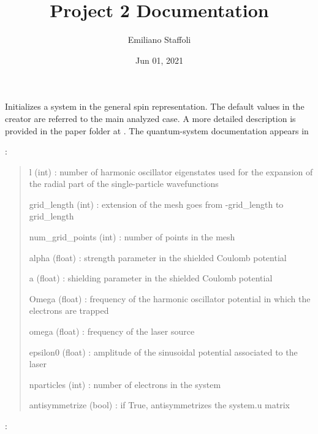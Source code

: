 \documentclass[letterpaper,10pt,english]{sphinxmanual}
\title{Project 2 Documentation}
\date{Jun 01, 2021}
\author{Emiliano Staffoli}
\begin{document}
\pagestyle{empty}
\sphinxmaketitle
\pagestyle{plain}
\sphinxtableofcontents
\pagestyle{normal}
\label{\detokenize{index::doc}}


\begin{fulllineitems}
\label{\detokenize{index:do.GHF}}
Initializes a system in the general spin representation. The default values in the creator are referred to the main analyzed case.
A more detailed description is provided in the paper folder at .
The quantum-system documentation appears in 

:
\begin{quote}

l (int) : number of harmonic oscillator eigenstates used for the expansion of the radial part of the single-particle wavefunctions

grid\_length (int) : extension of the mesh goes from -grid\_length to grid\_length

num\_grid\_points (int) : number of points in the mesh

alpha (float) : strength parameter in the shielded Coulomb potential

a (float) : shielding parameter in the shielded Coulomb potential

Omega (float) : frequency of the harmonic oscillator potential in which the electrons are trapped

omega (float) : frequency of the laser source

epsilon0 (float) : amplitude of the sinusoidal potential associated to the laser

nparticles (int) : number of electrons in the system

antisymmetrize (bool) : if True, antisymmetrizes the system.u matrix
\end{quote}

:
\begin{quote}


\end{quote}
\end{fulllineitems}
\end{document}
